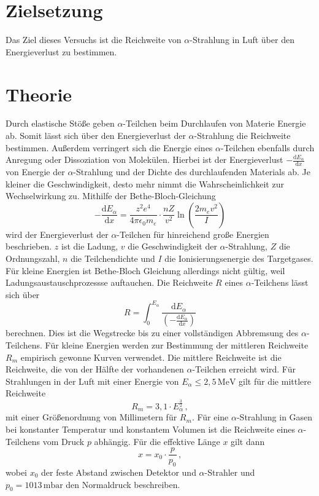 \nocite{anleitungV701}
\section{Zielsetzung}
\label{sec:Zielsetzung}
Das Ziel dieses Versuchs ist die Reichweite von $\alpha$-Strahlung in Luft über den Energieverlust zu bestimmen. 

\section{Theorie}
\label{sec:Theorie}
Durch elastische Stöße geben $\alpha$-Teilchen beim Durchlaufen von Materie Energie ab. Somit lässt sich über den Energieverlust der $\alpha$-Strahlung 
die Reichweite bestimmen.  Außerdem verringert sich die Energie eines $\alpha$-Teilchen ebenfalls durch Anregung oder Dissoziation von Molekülen. Hierbei 
ist der Energieverlust $-\frac{\text{d}E_{\alpha}}{\text{d}x}$ von Energie der $\alpha$-Strahlung und der Dichte des durchlaufenden Materials ab. Je kleiner 
die Geschwindigkeit, desto mehr nimmt die Wahrscheinlichkeit zur Wechselwirkung zu. Mithilfe der Bethe-Bloch-Gleichung
\begin{equation}
	-\frac{\text{d}E_{\alpha}}{\text{d}x} = \frac{z^2e^4}{4 \pi \epsilon_0 m_e} \cdot \frac{nZ}{v^2} \ln \left( \frac{2m_e v^2}{I} \right)
\label{eqn:Bethe-Bloch-Gleichung}
\end{equation}
wird der Energieverlust der $\alpha$-Teilchen für hinreichend große Energien beschrieben. $z$ ist die Ladung, $v$ die Geschwindigkeit der $\alpha$-Strahlung, 
$Z$ die Ordnungszahl, $n$ die Teilchendichte und $I$ die Ionisierungsenergie des Targetgases. Für kleine Energien ist Bethe-Bloch Gleichung allerdings nicht 
gültig, weil Ladungsaustauschprozessse auftauchen. Die Reichweite $R$ eines $\alpha$-Teilchens lässt sich über 
\begin{equation}
	R= \int_{0}^{E_{\alpha}} \frac{\text{d}E_{\alpha}}{\left(-\frac{\text{d}E_{\alpha}}{\text{d}x}\right)}
\label{eqn:Reichweite}
\end{equation}
berechnen. Dies ist die Wegstrecke bis zu einer vollständigen Abbremsung des $\alpha$-Teilchens.
Für kleine Energien werden zur Bestimmung der mittleren Reichweite $R_m$ empirisch gewonne Kurven verwendet. Die mittlere Reichweite ist die Reichweite, die 
von der Hälfte der vorhandenen $\alpha$-Teilchen erreicht wird. Für Strahlungen in der Luft mit einer Energie von $E_{\alpha}  \leq 2,5\,\unit{\mega\eV}$ gilt 
für die mittlere Reichweite 
\begin{equation}
R_m= 3,1\cdot E_{\alpha}^{\frac{3}{2}}\,,
\label{eqn:mittlere_Reichweite}
\end{equation}
mit einer Größenordnung von Millimetern für  $R_m$.
Für eine $\alpha$-Strahlung in Gasen bei konstanter Temperatur und konstantem Volumen ist die Reichweite eines $\alpha$-Teilchens  vom Druck $p$ abhängig. 
Für die effektive Länge $x$ gilt dann
\begin{equation}
x= x_0\cdot \frac{p}{p_0}\,,
\label{eqn:effektive_Laenge}
\end{equation}
wobei $x_0$ der feste Abstand zwischen Detektor und $\alpha$-Strahler und $p_0 = 1013\,\unit{\milli\bar}$ den Normaldruck beschreiben.

